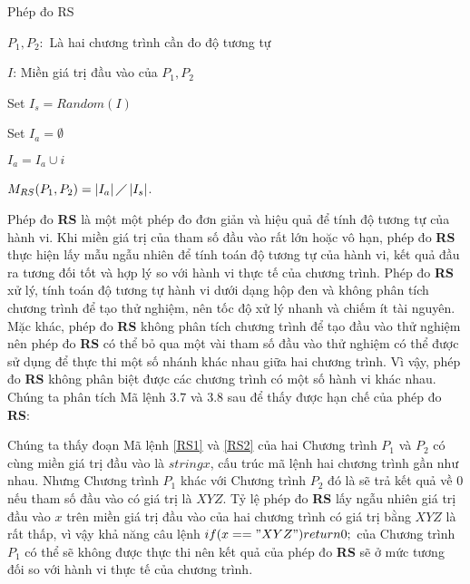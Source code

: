 \begin{algorithm}[H]
	\caption{Phép đo RS}
	\begin{algorithmic}	
		\item $P_{1}, P_{2}:$ Là hai chương trình cần đo độ tương tự
		\item $I$: Miền giá trị đầu vào của $P_{1}, P_{2}$
		\item Set $I_{s} = Random(I)$ 
		\item Set $I_{a} = \emptyset$ 
		  
				
				\State $I_{a} = I_{a} \cup i$		
				\EndIf
		\EndWhile
		\item $M_{RS}(P_{1}, P_{2}) = \left|I_{a}\right| \diagup \left|I_{s}\right| $. 
	\end{algorithmic}
\end{algorithm}


Phép đo \textbf{RS} là một một phép đo đơn giản và hiệu quả để tính độ tương tự của hành vi. Khi miền giá trị của tham số đầu vào rất lớn hoặc vô hạn, phép đo \textbf{RS} thực hiện lấy mẫu ngẫu nhiên để tính toán độ tương tự của hành vi, kết quả đầu ra tương đối tốt và hợp lý so với hành vi thực tế của chương trình. Phép đo \textbf{RS} xử lý, tính toán độ tương tự hành vi dưới dạng hộp đen và không phân tích chương trình để tạo thử nghiệm, nên tốc độ xử lý nhanh và chiếm ít tài nguyên. Mặc khác, phép đo \textbf{RS} không phân tích chương trình để tạo đầu vào thử nghiệm nên phép đo \textbf{RS} có thể bỏ qua một vài tham số đầu vào thử nghiệm có thể được sử dụng để thực thi một số nhánh khác nhau giữa hai chương trình. Vì vậy, phép đo \textbf{RS} không phân biệt được các chương trình có một số hành vi khác nhau. Chúng ta phân tích Mã lệnh $3.7$ và $3.8$ sau để thấy được hạn chế của phép đo \textbf{RS}:

{\scriptsize \begin{minipage}[t]{0.45\linewidth}
	
\end{minipage}
\hfill\vrule\hfill
\begin{minipage}[t]{0.45\linewidth} 
	
\end{minipage}}
 
Chúng ta thấy đoạn Mã lệnh \ref{RS1} và \ref{RS2} của hai Chương trình $P_{1}$ và $P_{2}$ có cùng miền giá trị đầu vào là $string x$, cấu trúc mã lệnh hai chương trình gần như nhau. Nhưng Chương trình $P_{1}$ khác với Chương trình $P_{2}$ đó là sẽ trả kết quả về $0$ nếu tham số đầu vào có giá trị là $XYZ$. Tỷ lệ phép đo \textbf{RS} lấy ngẫu nhiên giá trị đầu vào $x$ trên miền giá trị đầu vào của hai chương trình có giá trị bằng $XYZ$ là rất thấp, vì vậy khả năng câu lệnh $if (x == "XYZ") return 0;$ của Chương trình $P_{1}$ có thể sẽ không được thực thi nên kết quả của phép đo \textbf{RS} sẽ ở mức tương đối so với hành vi thực tế của chương trình.

